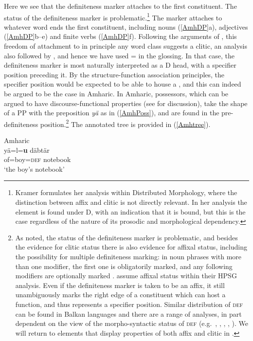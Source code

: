 \documentclass[output=paper,hidelinks]{langscibook}
\begin{document}
\newpage
Here we see that the definiteness marker attaches to the first constituent. The status of the definiteness marker is problematic.\footnote{Kramer formulates her analysis within Distributed Morphology, where the distinction between affix and clitic is not directly relevant. In her analysis the element is found under D, with an indication that it is bound, but this is the case regardless of the nature of its  prosodic and morphological dependency.} The marker attaches to whatever word ends the first constituent, including nouns (\ref{AmhDP}a), adjectives (\ref{AmhDP}b--e) and finite verbs (\ref{AmhDP}f).  Following the arguments of \citet[161]{lowe2015clitic}, this freedom of attachment to in principle any word class suggests a clitic, an analysis also followed by \citet{Lyons99}, and hence we have used = in the glossing. In that case, the definiteness marker is most naturally interpreted as a D head, with a specifier position preceding it. By the structure-function association principles, the specifier position would be expected to be able to house a {\DF}, and this can indeed be argued to be the case in Amharic. In Amharic, possessors, which can be argued to have discourse-functional properties (see  for discussion), take the shape of a PP with the preposition \emph{yä} as in (\ref{AmhPoss}), and are found in the pre-definiteness position.\footnote{As noted, the status of the definiteness marker is problematic, and besides the evidence for clitic status there is also evidence for affixal status, including the possibility for multiple definiteness marking: in noun phrases with more than one modifier, the first one is obligatorily marked, and any following modifiers are optionally marked \citep[202]{Kramer10}. \citet{BeermannEphrem07} assume affixal status within their HPSG analysis. Even if the definiteness marker is taken to be an affix, it still unambiguously marks the right edge of a constituent which can host a {\DF} function, and thus represents a specifier position. Similar distribution of \textsc{def} can be found in Balkan languages and there are a range of analyses, in part dependent on the view of the morpho-syntactic status of \textsc{def} (e.g.\ \citealt[117--120]{Sadock91}, \citealt[153--157]{Halpern95}, \citealt{DimiTomi09}, \citealt{BeOtPayn11}, \citealt{Franks15}). We will return to elements that display properties of both affix and clitic in .} The annotated tree is provided in (\ref{Amhtree}).

\ea\label{AmhPoss} Amharic\\
\gll yä=l\textbari\textdyoghlig=\textbf{u} däbtär\\
of=boy=\textsc{def} notebook\\
\glt `the boy's notebook' \citep[202]{Kramer10}
\z
\end{document}
